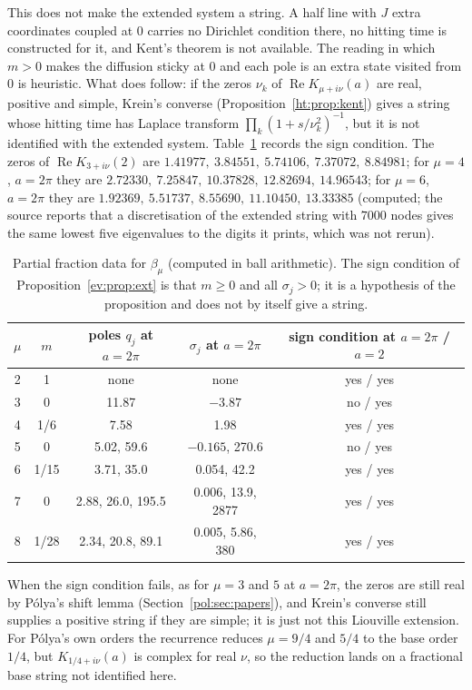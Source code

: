 This does not make the extended system a string. A half line with $J$ extra coordinates coupled at $0$ carries no Dirichlet condition there, no hitting time is constructed for it, and Kent's theorem is not available. The reading in which $m>0$ makes the diffusion sticky at $0$ and each pole is an extra state visited from $0$ is heuristic. What does follow: if the zeros $\nu_k$ of $\operatorname{Re}K_{\mu+i\nu}(a)$ are real, positive and simple, Krein's converse (Proposition~\ref{ht:prop:kent}) gives a string whose hitting time has Laplace transform $\prod_k(1+s/\nu_k^2)^{-1}$, but it is not identified with the extended system. Table~\ref{ev:tab:shift} records the sign condition. The zeros of $\operatorname{Re}K_{3+i\nu}(2)$ are $1.41977,\ 3.84551,\ 5.74106,\ 7.37072,\ 8.84981$; for $\mu=4$, $a=2\pi$ they are $2.72330,\ 7.25847,\ 10.37828,\ 12.82694,\ 14.96543$; for $\mu=6$, $a=2\pi$ they are $1.92369,\ 5.51737,\ 8.55690,\ 11.10450,\ 13.33385$ (computed; the source reports that a discretisation of the extended string with $7000$ nodes gives the same lowest five eigenvalues to the digits it prints, which was not rerun).

\begin{table}[h]\centering\small
\begin{tabular}{ccccc}
\toprule
$\mu$ & $m$ & poles $q_j$ at $a=2\pi$ & $\sigma_j$ at $a=2\pi$ & sign condition at $a=2\pi$ / $a=2$\\
\midrule
2 & 1 & none & none & yes / yes\\
3 & 0 & 11.87 & $-3.87$ & no / yes\\
4 & 1/6 & 7.58 & 1.98 & yes / yes\\
5 & 0 & 5.02, 59.6 & $-0.165$, 270.6 & no / yes\\
6 & 1/15 & 3.71, 35.0 & 0.054, 42.2 & yes / yes\\
7 & 0 & 2.88, 26.0, 195.5 & 0.006, 13.9, 2877 & yes / yes\\
8 & 1/28 & 2.34, 20.8, 89.1 & 0.005, 5.86, 380 & yes / yes\\
\bottomrule
\end{tabular}
\caption{Partial fraction data for $\beta_\mu$ (computed in ball arithmetic). The sign condition of Proposition~\ref{ev:prop:ext} is that $m\ge0$ and all $\sigma_j>0$; it is a hypothesis of the proposition and does not by itself give a string.}\label{ev:tab:shift}
\end{table}

When the sign condition fails, as for $\mu=3$ and $5$ at $a=2\pi$, the zeros are still real by P\'olya's shift lemma (Section~\ref{pol:sec:papers}), and Krein's converse still supplies a positive string if they are simple; it is just not this Liouville extension. For P\'olya's own orders the recurrence reduces $\mu=9/4$ and $5/4$ to the base order $1/4$, but $K_{1/4+i\nu}(a)$ is complex for real $\nu$, so the reduction lands on a fractional base string not identified here.

